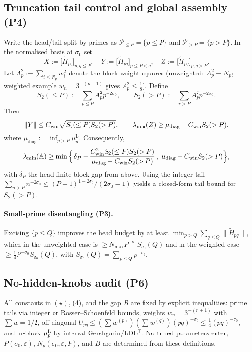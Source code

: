 \documentclass[11pt]{article}
\theoremstyle{definition}
\theoremstyle{remark}
\begin{document}
\subsection*{Truncation tail control and global assembly (P4)}
Write the head/tail split by primes as $\mathcal P_{\le P}=\{p\le P\}$ and $\mathcal P_{>P}=\{p>P\}$. In the normalised basis at $\sigma_0$ set
\[ X:=\bigl[\widetilde H_{pq}\bigr]_{p,q\le P},\quad Y:=\bigl[\widetilde H_{pq}\bigr]_{p\le P<q},\quad Z:=\bigl[\widetilde H_{pq}\bigr]_{p,q>P}. \]
Let $A_p^2:=\sum_{i\le N_p} w_i^2$ denote the block weight squares (unweighted: $A_p^2=N_p$; weighted example $w_n=3^{-(n+1)}$ gives $A_p^2\le\tfrac18$). Define
\[ S_2(\le P):=\sum_{p\le P} A_p^2 p^{-2\sigma_0},\qquad S_2(>P):=\sum_{p>P} A_p^2 p^{-2\sigma_0}. \]
Then
\[ \|Y\|\le C_{\rm win}\sqrt{S_2(\le P)S_2(>P)},\qquad \lambda_{\min}(Z)\ge \mu_{\mathrm{diag}}-C_{\rm win}S_2(>P), \]
where $\mu_{\mathrm{diag}}:=\inf_{p>P}\mu_p^{\mathrm L}$. Consequently,
\[ \lambda_{\min}(\mathbb A)\ge \min\Big\{\,\delta_P - \dfrac{C_{\rm win}^2 S_2(\le P)S_2(>P)}{\mu_{\mathrm{diag}}-C_{\rm win}S_2(>P)}\,,\ \mu_{\mathrm{diag}}-C_{\rm win}S_2(>P)\Big\}, \]
with $\delta_P$ the head finite-block gap from above. Using the integer tail $\sum_{n>P}n^{-2\sigma_0}\le (P-1)^{1-2\sigma_0}/(2\sigma_0-1)$ yields a closed-form tail bound for $S_2(>P)$.
\paragraph{Small-prime disentangling (P3).}
Excising $\{p\le Q\}$ improves the head budget by at least $\min_{p>Q}\sum_{q\le Q}\|\widetilde H_{pq}\|$, which in the unweighted case is $\ge N_{\max} P^{-\sigma_0} S_{\sigma_0}(Q)$ and in the weighted case $\ge \tfrac14 P^{-\sigma_0} S_{\sigma_0}(Q)$, with $S_{\sigma_0}(Q)=\sum_{p\le Q}p^{-\sigma_0}$.

\subsection*{No-hidden-knobs audit (P6)}
All constants in $(\star)$, (4), and the gap $B$ are fixed by explicit inequalities: prime tails via integer or Rosser--Schoenfeld bounds, weights $w_n=3^{-(n+1)}$ with $\sum w=1/2$, off-diagonal $U_{pq}\le (\sum w^{(p)})(\sum w^{(q)})(pq)^{-\sigma_0}\le \tfrac14 (pq)^{-\sigma_0}$, and in-block $\mu_p^{\rm L}$ by interval Gershgorin/LDL$^\top$. No tuned parameters enter; $P(\sigma_0,\varepsilon)$, $N_p(\sigma_0,\varepsilon,P)$, and $B$ are determined from these definitions.
\end{document}
